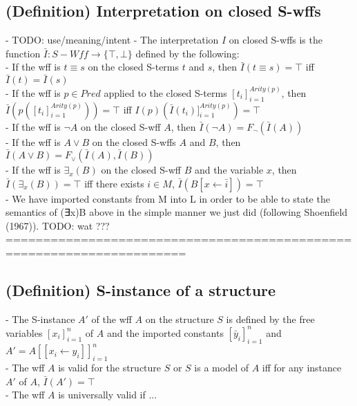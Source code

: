 \documentclass{article}
\begin{document}
\subsection{(Definition) Interpretation on closed S-wffs}
	- TODO: use/meaning/intent
	- The interpretation $I$ on closed S-wffs is the function $\bar I: S-Wff \rightarrow \{\top, \bot\}$ defined by the following: \\
		- If the wff is $t \equiv s$ on the closed S-terms $t$ and $s$, then $\bar I(t \equiv s) = \top$ iff $\bar I(t) = \bar I(s)$ \\
		- If the wff is $p \in Pred$ applied to the closed S-terms $[t_i]_{i=1}^{Arity(p)}$, then $\bar I\left(p([t_i]_{i=1}^{Arity(p)})\right) = \top$ iff $I(p)\left(\bar I(t_i)]_{i=1}^{Arity(p)}\right) = \top$ \\
		- If the wff is $\lnot A$ on the closed S-wff $A$, then $\bar I(\lnot A) = F_\lnot(\bar I(A))$ \\
		- If the wff is $A \lor B$ on the closed S-wffs $A$ and $B$, then $\bar I(A \lor B) = F_\lor(\bar I(A), \bar I(B))$ \\
		- If the wff is $\exists_x(B)$ on the closed S-wff $B$ and the variable $x$, then $\bar I(\exists_x(B)) = \top$ iff there exists $i \in M$, $\bar I(B[x \leftarrow \bar i]) = \top$ \\
	- We have imported constants from M into L in order to be able to state the semantics of (∃x)B above in the simple manner we just did (following Shoenﬁeld (1967)). TODO: wat ??? \\
	======================================================================
\subsection{(Definition) S-instance of a structure}
	- The S-instance $A'$ of the wff $A$ on the structure $S$ is defined by the free variables $[x_i]_{i=1}^n$ of $A$ and the imported constants $[\bar y_i]_{i=1}^n$ and $A' = A[[x_i \leftarrow y_i]]_{i=1}^n$ \\
	- The wff $A$ is valid for the structure $S$ or $S$ is a model of $A$ iff for any instance $A'$ of $A$, $\bar I(A') = \top$ \\
	- The wff $A$ is universally valid if ...
\begin{comment}
\subsection{() }
	- 
	======================================================================

Hotkeys:
Ctrl+R
Ctrl+K, Ctrl+1
Ctrl+K, Ctrl+J
Ctrl+Shift+[
Ctrl+Shift+[

TODO:
- TODO REREAD STUFF AFTER DEFINITIONS ARE DONE, SKIPPED A LOT
- fix hypothesis referencing - WITH Hypothesis (SOMETHING)
- fix \vdash \vDash writing metaproofs - consistency
- use cantor product + sequences instead kleene star 
- closed terms are important in semantics ?? review dis
\end{comment}
\end{document}
